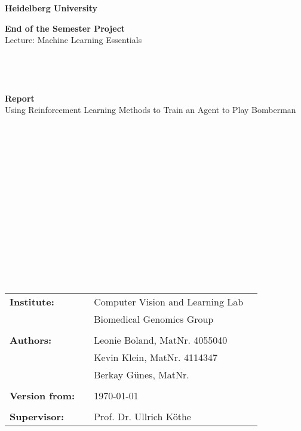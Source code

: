 \thispagestyle{empty}

\begin{verbatim}
	
	
	
\end{verbatim}

\begin{center}
	\Large{\textbf{Heidelberg University}}
\end{center}


\begin{center}
	\Large{\textbf{End of the Semester Project}}\\
	\Large{Lecture: Machine Learning Essentials}
\end{center}

\begin{verbatim}
	
	
	
\end{verbatim}

\begin{center}
	\large{\textbf{Report}}\\
	\huge{Using Reinforcement Learning Methods to Train an Agent to Play Bomberman}	
\end{center}

\begin{verbatim}
	
	
	
	
	
	
	
	
	
	
	
	
	
	
	
	
\end{verbatim}

\begin{flushleft}
	\begin{tabular}{llll}
		\textbf{Institute:} && Computer Vision and Learning Lab & \\
		&& Biomedical Genomics Group& \\
		&& \\
		\textbf{Authors:} & & Leonie Boland, MatNr. 4055040& \\
		& & Kevin Klein, MatNr. 4114347& \\
		& & Berkay Günes, MatNr. & \\
		& &\\
		\textbf{Version from:} & & \today &\\
		& & \\
		\textbf{Supervisor:} & & Prof. Dr. Ullrich Köthe &\\
	\end{tabular}
\end{flushleft}